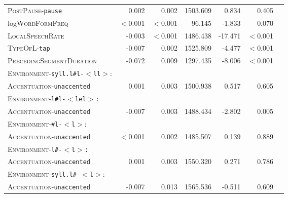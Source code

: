 \begin{table}[H]
\begin{center}
{\begin{tabular} {lrrrrrr}
		\textsc{PostPause}-\texttt{pause} & \color[HTML]{9B9B9B} 0.002 &\color[HTML]{9B9B9B}  0.002 & \color[HTML]{9B9B9B} 1503.609 &\color[HTML]{9B9B9B}  0.834 &\color[HTML]{9B9B9B}  0.405 \\ 
		
		log\textsc{WordFormFreq }& \color[HTML]{9B9B9B} $<$0.001 & \color[HTML]{9B9B9B} $<$0.001 & \color[HTML]{9B9B9B} 96.145 & \color[HTML]{9B9B9B} -1.833 & \color[HTML]{9B9B9B} 0.070 \\ 
		
		\textsc{LocalSpeechRate} & -0.003 &$<$0.001  & 1486.438 & -17.471 &$<$0.001 \\ 
		
		
		\textsc{TypeOfL}-\texttt{tap} & -0.007 & 0.002 & 1525.809 & -4.477 & $<$0.001 \\ 
		
		\textsc{PrecedingSegmentDuration} & -0.072 & 0.009 & 1297.435 & -8.006 & $<$0.001 \\ 
		
		\textsc{Environment}-\texttt{syll.l\#l-$<$ll$>$}:&&&&&\\
		\textsc{Accentuation}-\texttt{unaccented} & \color[HTML]{9B9B9B} 0.001 & \color[HTML]{9B9B9B} 0.003 & \color[HTML]{9B9B9B} 1500.938 &\color[HTML]{9B9B9B}  0.517 & \color[HTML]{9B9B9B} 0.605 \\ 
		
		\textsc{Environment}-\texttt{l\#l-$<$lel$>$:}&&&&&\\
		\textsc{Accentuation}-\texttt{unaccented} & -0.007 & 0.003 & 1488.434 & -2.802 & 0.005 \\
		
		\textsc{Environment}-\texttt{\#l-$<$l$>$}:&&&&&\\
		\textsc{Accentuation}-\texttt{unaccented} & \color[HTML]{9B9B9B} $<$0.001  & \color[HTML]{9B9B9B} 0.002 & \color[HTML]{9B9B9B} 1485.507 & \color[HTML]{9B9B9B} 0.139 & \color[HTML]{9B9B9B} 0.889 \\ 
		
		\textsc{Environment}-\texttt{l\#-$<$l$>$:}&&&&&\\
		\textsc{Accentuation}-\texttt{unaccented} & \color[HTML]{9B9B9B} 0.001 & \color[HTML]{9B9B9B} 0.003 & \color[HTML]{9B9B9B} 1550.320 &  \color[HTML]{9B9B9B} 0.271 &\color[HTML]{9B9B9B}  0.786 \\ 
		
		\textsc{Environment}-\texttt{syll.l\#-$<$l$>$}:&&&&&\\
		\textsc{Accentuation}-\texttt{unaccented} &\color[HTML]{9B9B9B}  -0.007 &\color[HTML]{9B9B9B}  0.013 & \color[HTML]{9B9B9B} 1565.536 &\color[HTML]{9B9B9B}  -0.511 &\color[HTML]{9B9B9B}  0.609 \\ 
		

\end{tabular}}
\end{center}
\end{table}
